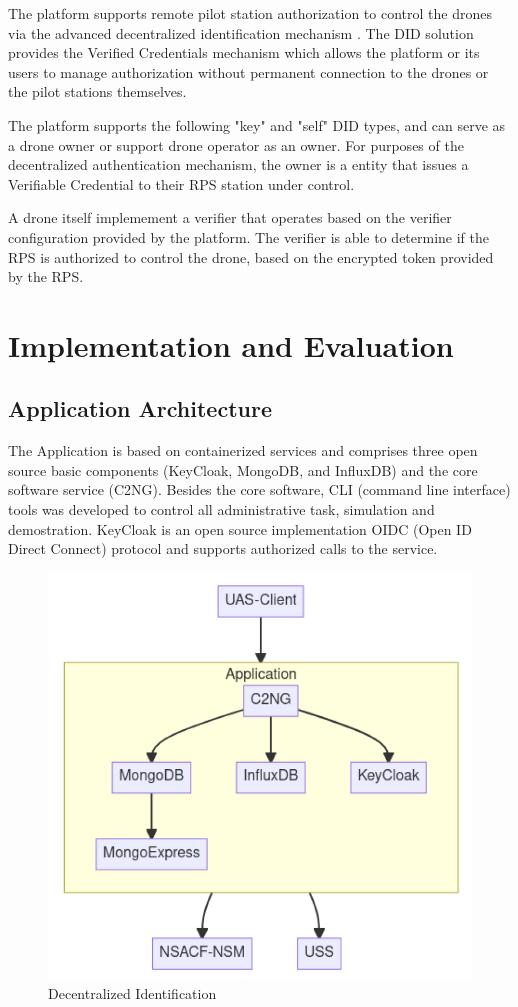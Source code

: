 \documentclass[a4paper,conference]{IEEEtran}
\begin{document}
The platform supports remote pilot station authorization to control the drones via the advanced decentralized identification mechanism \cite{excid:did}. The DID solution provides the Verified Credentials mechanism which allows the platform or its users to manage authorization without permanent connection to the drones or the pilot stations themselves.

The platform supports the following "key" and "self" DID types, and can serve as a drone owner or support drone operator as an owner. For purposes of the decentralized authentication mechanism, the owner is a entity that issues a Verifiable Credential to their RPS station under control.

A drone itself implemement a verifier that operates based on the verifier configuration provided by the platform. The verifier is able to determine if the RPS is authorized to control the drone, based on the encrypted token provided by the RPS.

\section{Implementation and Evaluation}

\subsection{Application Architecture}

The Application is based on containerized services and comprises three open source basic components (KeyCloak, MongoDB, and InfluxDB) and the core software service (C2NG). Besides the core software, CLI (command line interface) tools was developed to control all administrative task, simulation and demostration. KeyCloak is an open source implementation OIDC (Open ID Direct Connect) protocol and supports authorized calls to the service.

\begin{figure}[!ht]
\centering
\includegraphics[width=0.9\linewidth]{images/arch.png}
\caption{Decentralized Identification}\label{fig:arch}
\end{figure}
\end{document}
